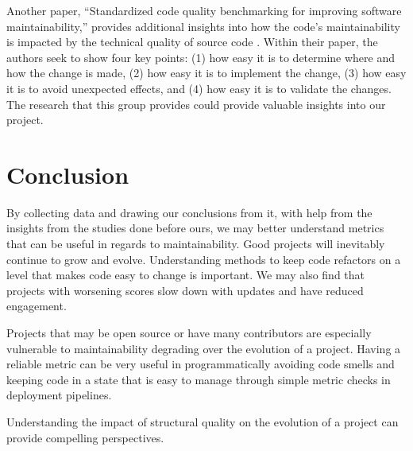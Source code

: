 \documentclass[12pt,conference]{IEEEtran}
\begin{document}
Another paper, ``Standardized code quality benchmarking for improving software maintainability,'' provides additional insights into how the code's maintainability is impacted by the technical quality of source code \cite{baggen:2012}. Within their paper, the authors seek to show four key points: (1) how easy it is to determine where and how the change is made, (2) how easy it is to implement the change, (3) how easy it is to avoid unexpected effects, and (4) how easy it is to validate the changes. The research that this group provides could provide valuable insights into our project.

\section{Conclusion}

By collecting data and drawing our conclusions from it, with help from the insights from the studies done before ours, we may better understand metrics that can be useful in regards to maintainability. Good projects will inevitably continue to grow and evolve. Understanding methods to keep code refactors on a level that makes code easy to change is important. We may also find that projects with worsening scores slow down with updates and have reduced engagement.

Projects that may be open source or have many contributors are especially vulnerable to maintainability degrading over the evolution of a project. Having a reliable metric can be very useful in programmatically avoiding code smells and keeping code in a state that is easy to manage through simple metric checks in deployment pipelines.

Understanding the impact of structural quality on the evolution of a project can provide compelling perspectives.

\newpage


\end{document}
